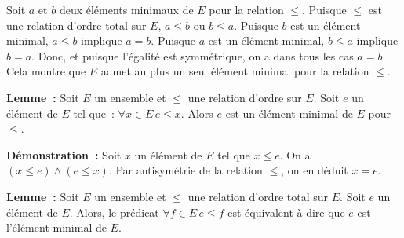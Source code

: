     Soit $a$ et $b$ deux éléments minimaux de $E$ pour la relation $\leq$.
    Puisque $\leq$ est une relation d'ordre total sur $E$, $a \leq b$ ou $b \leq a$. 
    Puisque $b$ est un élément minimal, $a \leq b$ implique $a = b$.
    Puisque $a$ est un élément minimal, $b \leq a$ implique $b = a$.
    Donc, et puisque l'égalité est symmétrique, on a dans tous les cas $a = b$.
    Cela montre que $E$ admet au plus un seul élément minimal pour la relation $\leq$.

   \done 

\medskip

\noindent\textbf{Lemme :} Soit $E$ un ensemble et $\leq$ une relation d'ordre sur $E$. 
    Soit $e$ un élément de $E$ tel que : $\forall x \in E \, e \leq x$. 
    Alors $e$ est un élément minimal de $E$ pour $\leq$.

\medskip

\noindent\textbf{Démonstration :} 
    Soit $x$ un élément de $E$ tel que $x \leq e$. 
    On a $(x \leq e) \wedge (e \leq x)$. 
    Par antisymétrie de la relation $\leq$, on en déduit $x = e$.

   \done 

\medskip

\noindent\textbf{Lemme :} Soit $E$ un ensemble et $\leq$ une relation d'ordre total sur $E$. 
    Soit $e$ un élément de $E$.
    Alors, le prédicat $\forall f \in E \, e \leq f$ est équivalent à dire que $e$ est l'élément minimal de $E$.

\medskip

